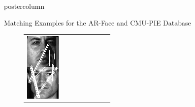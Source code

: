 \documentclass[final,hyperref={pdfpagelabels=false}]{beamer}
\begin{document}
\begin{frame}
\begin{columns}
\begin{column}{.49\textwidth}
\begin{beamercolorbox}[center,wd=\textwidth]{postercolumn}
\begin{minipage}[T]{.95\textwidth}
{\begin{block}{Matching Examples for the AR-Face and CMU-PIE Database}
\begin{figure}
\begin{tabular}{p{.09\linewidth} | p{.12\linewidth} | p{.12\linewidth} | p{.12\linewidth} || p{.12\linewidth} | p{.12\linewidth} | p{.12\linewidth} | p{.09\linewidth} }
                  \includegraphics[width=1.0\linewidth]{paper/bmvc09-surf/figures/matchings/cmupie-usurf/maximum_07-27-22.pgm--04-27-08}
                  &

\end{tabular}
\end{figure}
\end{block}}
\end{minipage}
\end{beamercolorbox}
\end{column}
\end{columns}
\end{frame}
\end{document}
